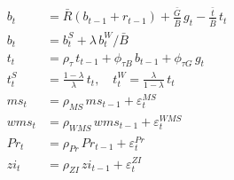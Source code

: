 \documentclass[12pt]{article}
\begin{document}
\begin{align}
  \tag{35. Gov.\ spending shock} \\[4pt]
b_t &= \bar{R}(b_{t-1} + r_{t-1})
  + \tfrac{\bar{G}}{\bar{B}}\,g_t - \tfrac{\bar{t}}{\bar{B}}\,t_t
  \tag{36. Gov.\ budget constraint} \\[4pt]
b_t &= b^S_t + \lambda\, b^W_t/\bar{B}
  \tag{37. Bond market clearing} \\[4pt]
t_t &= \rho_\tau\, t_{t-1}
  + \phi_{\tau B}\, b_{t-1} + \phi_{\tau G}\, g_t
  \tag{38. Fiscal rule} \\[4pt]
t^S_t &= \tfrac{1-\lambda}{\lambda}\,t_t, \quad
  t^W_t = \tfrac{\lambda}{1-\lambda}\,t_t
  \tag{39. Tax allocation} \\[4pt]
ms_t &= \rho_{MS}\, ms_{t-1} + \varepsilon^{MS}_t
  \tag{40. Price markup shock} \\[4pt]
wms_t &= \rho_{WMS}\, wms_{t-1} + \varepsilon^{WMS}_t
  \tag{41. Wage markup shock} \\[4pt]
Pr_t &= \rho_{Pr}\, Pr_{t-1} + \varepsilon^{Pr}_t
  \tag{42. Preference shock} \\[4pt]
zi_t &= \rho_{ZI}\, zi_{t-1} + \varepsilon^{ZI}_t
  \tag{43. MEI shock}
\end{align}
\end{document}
